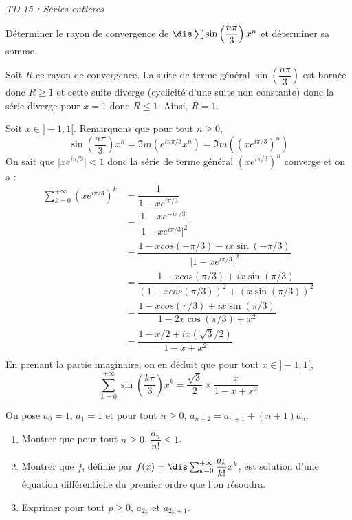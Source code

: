 \documentclass[a4paper,10pt]{report}
\begin{document}
\everymath{\displaystyle}


\begin{center}
\textit{{ {\huge TD 15 : Séries entières}}}
\end{center}

\begin{Exercice}{}
Déterminer le rayon de convergence de $\dis \sum \sin \left( \dfrac{n \pi}{3} \right) x^n$ et déterminer sa somme.
\end{Exercice}

\corr Soit $R$ ce rayon de convergence. La suite de terme général $\sin \left( \dfrac{n \pi}{3} \right)$ est bornée donc $R \geq 1$ et cette suite diverge (cyclicité d'une suite non constante) donc la série diverge pour $x=1$ donc $R \leq 1$. Ainsi, $R=1$.

\medskip

\noindent Soit $x \in ]-1,1[$. Remarquons que pour tout $n \geq 0$,
$$ \sin \left( \dfrac{n \pi}{3} \right) x^n = \Im m (e^{in \pi/3} x^n) = \Im m ((xe^{i \pi/3})^n)$$
On sait que $\vert xe^{i \pi/3} \vert <1$ donc la série de terme général $(xe^{i \pi/3})^n$ converge et on a :
\begin{align*}
\sum_{k=0}^{+ \infty} (xe^{i \pi/3})^k & = \dfrac{1}{1-xe^{i \pi/3}} \\
& = \dfrac{1-xe^{-i \pi/3}}{\vert 1-x e^{i \pi/3}\vert^2} \\
& = \dfrac{1-x cos(-\pi/3)-i x\sin(-\pi/3)}{\vert 1-x e^{i \pi/3}\vert^2} \\
& = \dfrac{1-x cos(\pi/3)+i x\sin(\pi/3)}{(1-x cos(\pi/3))^2+ (x\sin(\pi/3))^2} \\
& = \dfrac{1-x cos(\pi/3)+i x\sin(\pi/3)}{1-2x \cos(\pi/3)+x^2} \\
& = \dfrac{1-x/2 +i x(\sqrt{3}/2)}{1-x+x^2} \\
\end{align*}
En prenant la partie imaginaire, on en déduit que pour tout $x \in ]-1,1[$,
$$ \sum_{k=0}^{+ \infty} \sin \left( \dfrac{k \pi}{3} \right) x^k =\dfrac{\sqrt{3}}{2} \times \dfrac{x}{1-x+x^2}$$

\begin{Exercice}{} On pose $a_0=1$, $a_1=1$ et pour tout $n \geq 0$, $a_{n+2} = a_{n+1} + (n+1)a_n$.
\begin{enumerate}
\item Montrer que pour tout $n \geq 0$, $\dfrac{a_n}{n!} \leq 1$.
\item Montrer que $f$, définie par $f(x) = \dis \sum_{k=0}^{+ \infty} \dfrac{a_k}{k!}x^k$, est solution d'une équation différentielle du premier ordre que l'on résoudra.
\item Exprimer pour tout $p \geq 0$, $a_{2p}$ et $a_{2p+1}$.
\end{enumerate}
\end{Exercice}
\end{document}
